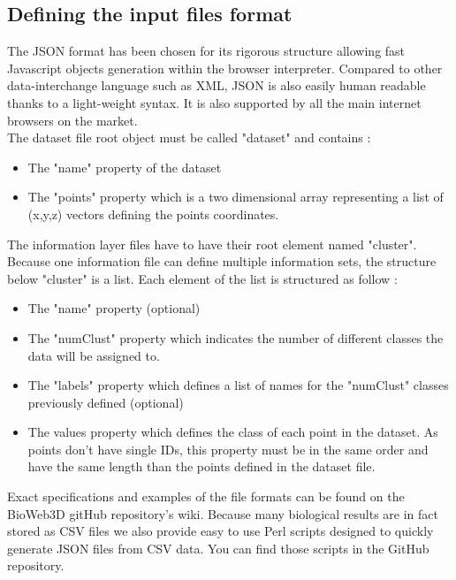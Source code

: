 \documentclass{bioinfo}
\begin{document}
\subsection{Defining the input files format}
The JSON format has been chosen for its rigorous structure allowing fast Javascript objects generation within the browser interpreter. Compared to other data-interchange language such as XML, JSON is also easily human readable thanks to a light-weight syntax. It is also supported by all the main internet browsers on the market.\\
The dataset file root object must be called "dataset" and contains :
\begin{itemize}
\item The "name" property of the dataset
\item The "points" property which is a two dimensional array representing a list of (x,y,z) vectors defining the points coordinates.
\end{itemize}

The information layer files have to have their root element named  "cluster". Because one information file can define multiple information sets, the structure below "cluster" is a list. Each element of the list is structured as follow :
\begin{itemize}
\item The "name" property (optional)
\item The "numClust" property which indicates the number of different classes the data will be assigned to.
\item The "labels" property which defines a list of names for the "numClust" classes previously defined (optional)
\item The values property which defines the class of each point in the dataset. As points don't have single IDs, this property must be in the same order and have the same length than the points defined in the dataset file.
\end{itemize}
Exact specifications and examples of the file formats can be found on the BioWeb3D gitHub repository's wiki. Because many biological results are in fact stored as CSV files we also provide easy to use Perl scripts designed to quickly generate JSON files from CSV data. You can find those scripts in the GitHub repository.
\end{document}
